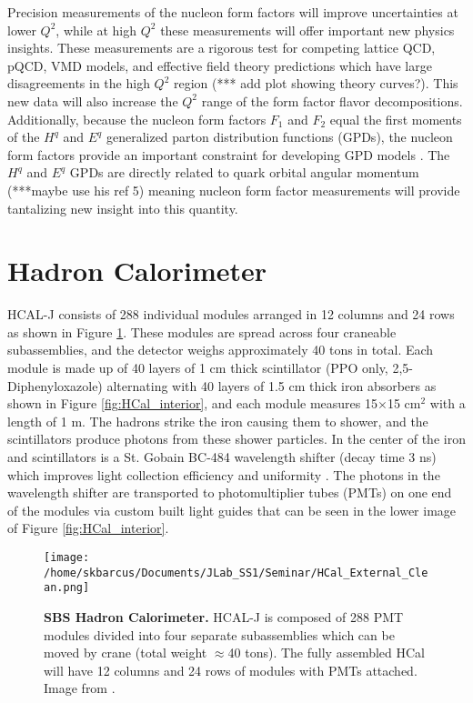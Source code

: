 \documentclass[review]{elsarticle}
\newcommand{\hcal}{HCAL-J }
\newcommand{\q}{$Q^2$ }
\begin{document}
	Precision measurements of the nucleon form factors will improve uncertainties at lower $Q^2$, while at high \q these measurements will offer important new physics insights. These measurements are a rigorous test for competing lattice QCD, pQCD, VMD models, and effective field theory predictions which have large disagreements in the high \q region (*** add plot showing theory curves?). This new data will also increase the \q range of the form factor flavor decompositions. Additionally, because the nucleon form factors $F_1$ and $F_2$ equal the first moments of the $H^q$ and $E^q$ generalized parton distribution functions (GPDs), the nucleon form factors provide an important constraint for developing GPD models \cite{gen_proposal}. The $H^q$ and $E^q$ GPDs are directly related to quark orbital angular momentum \cite{cisbani_2014}(***maybe use his ref 5) meaning nucleon form factor measurements will provide tantalizing new insight into this quantity. \\ 

\section{Hadron Calorimeter}
\label{hcal}

\hcal consists of 288 individual modules arranged in 12 columns and 24 rows as shown in Figure \ref{fig:HCal}. These modules are spread across four craneable subassemblies, and the detector weighs approximately 40 tons in total. Each module is made up of 40 layers of 1 cm thick scintillator (PPO only, 2,5-Diphenyloxazole) alternating with 40 layers of 1.5 cm thick iron absorbers as shown in Figure \ref{fig:HCal_interior}, and each module measures 15$\times$15 cm$^2$ with a length of 1 m. The hadrons strike the iron causing them to shower, and the scintillators produce photons from these shower particles. In the center of the iron and scintillators is a St. Gobain BC-484 wavelength shifter (decay time 3 ns) which improves light collection efficiency and uniformity \cite{brio_2018}. The photons in the wavelength shifter are transported to photomultiplier tubes (PMTs) on one end of the modules via custom built light guides that can be seen in the lower image of Figure \ref{fig:HCal_interior}.\\

	\begin{figure}[!ht]
	\begin{center}
	\texttt{[image: /home/skbarcus/Documents/JLab\_SS1/Seminar/HCal\_External\_Clean.png]}
	\end{center}
	\caption{
	{\bf{SBS Hadron Calorimeter.}} \hcal is composed of 288 PMT modules divided into four separate subassemblies which can be moved by crane (total weight $\approx$40 tons). The fully assembled HCal will have 12 columns and 24 rows of modules with PMTs attached. Image from \cite{brio_2018}.}
	\label{fig:HCal}
	\end{figure}	
	
\end{document}
